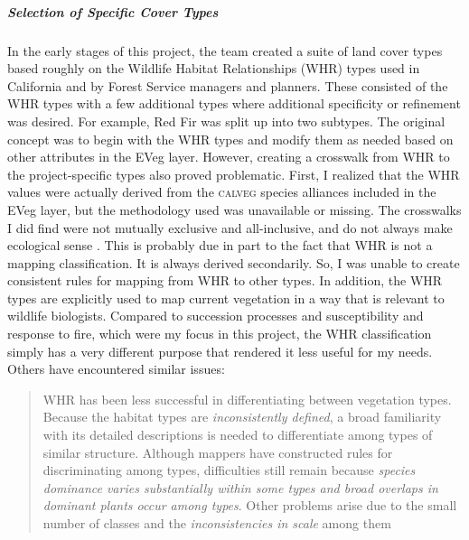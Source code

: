 

\subparagraph{Selection of Specific Cover Types}
In the early stages of this project, the team created a suite of land cover types based roughly on the Wildlife Habitat Relationships (WHR) types used in California and by Forest Service managers and planners. These consisted of the WHR types with a few additional types where additional specificity or refinement was desired. For example, Red Fir was split up into two subtypes. The original concept was to begin with the WHR types and modify them as needed based on other attributes in the EVeg layer. However, creating a crosswalk from WHR to the project-specific types also proved problematic. First, I realized that the WHR values were actually derived from the \textsc{calveg} species alliances included in the EVeg layer, but the methodology used was unavailable or missing. The crosswalks I did find were not mutually exclusive and all-inclusive, and do not always make ecological sense \citep{Keeler-Wolf2007,DeBecker1988,Game2005}. This is probably due in part to the fact that WHR is not a mapping classification. It is always derived secondarily. So, I was unable to create consistent rules for mapping from WHR to other types. In addition, the WHR types are explicitly used to map current vegetation in a way that is relevant to wildlife biologists. Compared to succession processes and susceptibility and response to fire, which were my focus in this project, the WHR classification simply has a very different purpose that rendered it less useful for my needs. Others have encountered similar issues:
%
\begin{quote}
WHR has been less successful in differentiating between vegetation types. Because the habitat types are \emph{inconsistently defined}, a broad familiarity with its detailed descriptions is needed to differentiate among types of similar structure. Although mappers have constructed rules for discriminating among types, difficulties still remain because \emph{species dominance varies substantially within some types and broad overlaps in dominant plants occur among types}. Other problems arise due to the small number of classes and the \emph{inconsistencies in scale} among them \citep[23, emphasis added]{Keeler-Wolf2007}
\end{quote}

